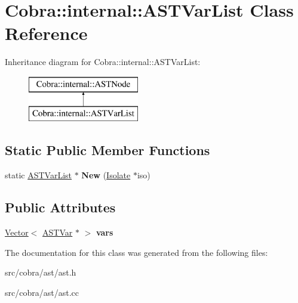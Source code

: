 \hypertarget{class_cobra_1_1internal_1_1_a_s_t_var_list}{\section{Cobra\+:\+:internal\+:\+:A\+S\+T\+Var\+List Class Reference}
\label{class_cobra_1_1internal_1_1_a_s_t_var_list}
}
Inheritance diagram for Cobra\+:\+:internal\+:\+:A\+S\+T\+Var\+List\+:\begin{figure}[H]
\begin{center}
\leavevmode
\includegraphics[height=2.000000cm]{class_cobra_1_1internal_1_1_a_s_t_var_list}
\end{center}
\end{figure}
\subsection*{Static Public Member Functions}
\begin{DoxyCompactItemize}
\item 
\hypertarget{class_cobra_1_1internal_1_1_a_s_t_var_list_ab8d067cdcde9de6a9cf2c19133e9266e}{static \hyperlink{class_cobra_1_1internal_1_1_a_s_t_var_list}{A\+S\+T\+Var\+List} $\ast$ {\bfseries New} (\hyperlink{class_cobra_1_1internal_1_1_isolate}{Isolate} $\ast$iso)}\label{class_cobra_1_1internal_1_1_a_s_t_var_list_ab8d067cdcde9de6a9cf2c19133e9266e}

\end{DoxyCompactItemize}
\subsection*{Public Attributes}
\begin{DoxyCompactItemize}
\item 
\hypertarget{class_cobra_1_1internal_1_1_a_s_t_var_list_af5b69caae69e01edd42e7325d09ad109}{\hyperlink{class_cobra_1_1internal_1_1_vector}{Vector}$<$ \hyperlink{class_cobra_1_1internal_1_1_a_s_t_var}{A\+S\+T\+Var} $\ast$ $>$ {\bfseries vars}}\label{class_cobra_1_1internal_1_1_a_s_t_var_list_af5b69caae69e01edd42e7325d09ad109}

\end{DoxyCompactItemize}


The documentation for this class was generated from the following files\+:\begin{DoxyCompactItemize}
\item 
src/cobra/ast/ast.\+h\item 
src/cobra/ast/ast.\+cc\end{DoxyCompactItemize}
